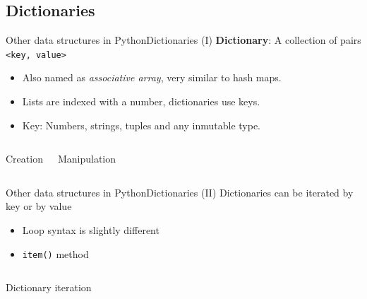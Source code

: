 \documentclass[10pt,compress]{beamer} %
\begin{document}
\subsection{Dictionaries}
\begin{frame}{Other data structures in Python}{Dictionaries (I)}
	\textbf{Dictionary}: A collection of pairs \texttt{<key, value>}
		\begin{itemize}
		\item Also named as \textit{associative array}, very similar to hash maps.
		\item Lists are indexed with a number, dictionaries use keys.
		\item Key: Numbers, strings, tuples and any inmutable type.
		\end{itemize}

		\vspace{-0.3cm}
    \begin{columns}
		\begin{block}{Creation}
		\vspace{-0.2cm}
		
		\vspace{-0.2cm}
		\end{block}
		\vspace{0.7cm}

		\begin{block}{Manipulation}
		\vspace{-0.2cm}
		
		\vspace{-0.2cm}
		\end{block}

	\end{columns}
\end{frame}

\begin{frame}{Other data structures in Python}{Dictionaries (II)}
	Dictionaries can be iterated by key or by value
		\begin{itemize}
		\item Loop syntax is slightly different
		\item \texttt{item()} method
		\end{itemize}

    \begin{columns}
		\begin{block}{Dictionary iteration}
		\vspace{-0.2cm}
		
		\vspace{-0.2cm}
		\end{block}
	\end{columns}
\end{frame}
\end{document}
